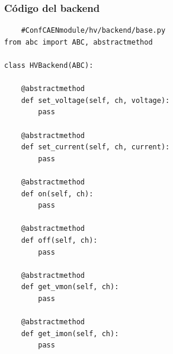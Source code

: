\documentclass{article}
\begin{document}
\subsubsection{Código del backend}
\begin{lstlisting}
    #ConfCAENmodule/hv/backend/base.py
from abc import ABC, abstractmethod

class HVBackend(ABC):

    @abstractmethod
    def set_voltage(self, ch, voltage):
        pass

    @abstractmethod
    def set_current(self, ch, current):
        pass

    @abstractmethod
    def on(self, ch):
        pass

    @abstractmethod
    def off(self, ch):
        pass

    @abstractmethod
    def get_vmon(self, ch):
        pass

    @abstractmethod
    def get_imon(self, ch):
        pass

\end{lstlisting}
\end{document}
